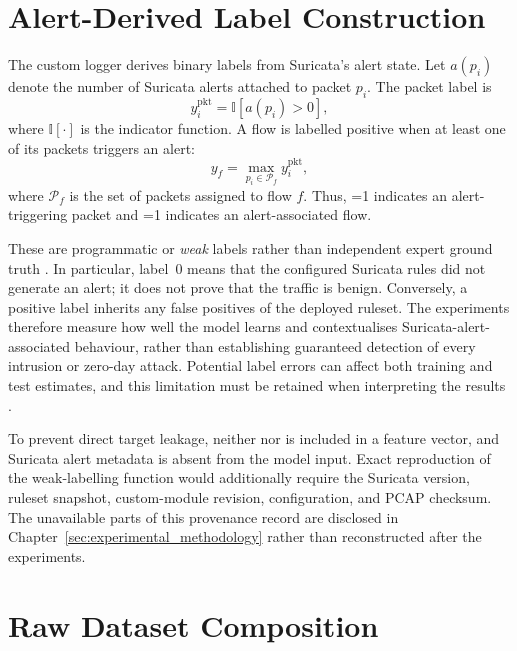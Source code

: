 \documentclass[11pt,fleqn]{report}
\begin{document}
\section{Alert-Derived Label Construction}
\label{subsec:label_construction}

The custom logger derives binary labels from Suricata's alert state. Let $a(p_i)$ denote the number of Suricata alerts attached to packet $p_i$. The packet label is
\begin{equation}
    y_i^{\mathrm{pkt}}
    = \mathbb{I}\!\left[a(p_i)>0\right],
    \label{eq:packet_alert_label}
\end{equation}
where $\mathbb{I}[\cdot]$ is the indicator function. A flow is labelled positive when at least one of its packets triggers an alert:
\begin{equation}
    y_f
    = \max_{p_i\in\mathcal{P}_f} y_i^{\mathrm{pkt}},
    \label{eq:flow_alert_label}
\end{equation}
where $\mathcal{P}_f$ is the set of packets assigned to flow $f$. Thus, =1 indicates an alert-triggering packet and =1 indicates an alert-associated flow.

These are programmatic or \emph{weak} labels rather than independent expert ground truth \cite{Ratner2017Snorkel}. In particular, label~0 means that the configured Suricata rules did not generate an alert; it does not prove that the traffic is benign. Conversely, a positive label inherits any false positives of the deployed ruleset. The experiments therefore measure how well the model learns and contextualises Suricata-alert-associated behaviour, rather than establishing guaranteed detection of every intrusion or zero-day attack. Potential label errors can affect both training and test estimates, and this limitation must be retained when interpreting the results \cite{Northcutt2021ConfidentLearning}.

To prevent direct target leakage, neither  nor  is included in a feature vector, and Suricata alert metadata is absent from the model input. Exact reproduction of the weak-labelling function would additionally require the Suricata version, ruleset snapshot, custom-module revision, configuration, and PCAP checksum. The unavailable parts of this provenance record are disclosed in Chapter~\ref{sec:experimental_methodology} rather than reconstructed after the experiments.

\section{Raw Dataset Composition}
\label{subsec:raw_composition}
\end{document}
